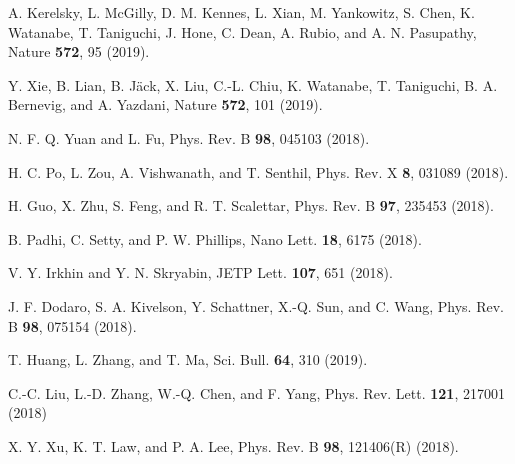 \documentclass[aps,prl,reprint,amssymb,groupedaddress,twocolumn]{revtex4}
\begin{document}
\begin{thebibliography}{99}
	A. Kerelsky, L. McGilly, D. M. Kennes, L. Xian, M. Yankowitz, S. Chen, K. Watanabe, T. Taniguchi, J. Hone, C. Dean, A. Rubio, and A. N. Pasupathy,
	Nature \textbf{572}, 95 (2019).
	
	Y. Xie, B. Lian, B. J\"{a}ck, X. Liu, C.-L. Chiu, K. Watanabe, T. Taniguchi, B. A. Bernevig, and A. Yazdani,
	Nature \textbf{572}, 101 (2019).

	
	N. F. Q. Yuan and L. Fu,
	Phys. Rev. B \textbf{98}, 045103 (2018).
	
	H. C. Po, L. Zou, A. Vishwanath, and  T. Senthil,
	Phys. Rev. X \textbf{8}, 031089 (2018).
	
	H. Guo, X. Zhu, S. Feng, and R. T. Scalettar,
	Phys. Rev. B \textbf{97}, 235453 (2018). 
	
	B. Padhi, C. Setty, and P. W. Phillips,
	Nano Lett. \textbf{18}, 6175 (2018).
	
	V. Y. Irkhin and Y. N. Skryabin,
	JETP Lett. \textbf{107}, 651 (2018).
	
	J. F. Dodaro, S. A. Kivelson, Y. Schattner, X.-Q. Sun, and C. Wang,
	Phys. Rev. B \textbf{98}, 075154 (2018).
	
	T. Huang, L. Zhang, and T. Ma,
	Sci. Bull. \textbf{64}, 310 (2019).
	
	C.-C. Liu, L.-D. Zhang, W.-Q. Chen, and  F. Yang,
	Phys. Rev. Lett. \textbf{121}, 217001 (2018)
	
	X. Y. Xu, K. T. Law, and P. A. Lee,
	Phys. Rev. B \textbf{98}, 121406(R) (2018).
	

\end{thebibliography}
\end{document}

